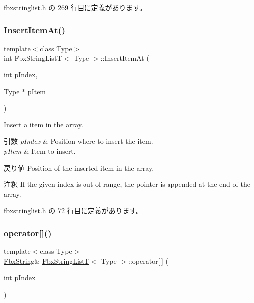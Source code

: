  fbxstringlist.\+h の 269 行目に定義があります。

\mbox{\label{class_fbx_string_list_t_aa9bd662d4638b711c615e37a9038a038}} 
\subsubsection{\texorpdfstring{Insert\+Item\+At()}{InsertItemAt()}}
{\footnotesize\ttfamily template$<$class Type$>$ \\
int \hyperlink{class_fbx_string_list_t}{Fbx\+String\+ListT}$<$ Type $>$\+::Insert\+Item\+At (\begin{DoxyParamCaption}\item[{int}]{p\+Index,  }\item[{Type $\ast$}]{p\+Item }\end{DoxyParamCaption})\hspace{0.3cm}{\ttfamily [inline]}}

Insert a item in the array. 
\begin{DoxyParams}{引数}
{\em p\+Index} & Position where to insert the item. \\
\hline
{\em p\+Item} & Item to insert. \\
\hline
\end{DoxyParams}
\begin{DoxyReturn}{戻り値}
Position of the inserted item in the array. 
\end{DoxyReturn}
\begin{DoxyRemark}{注釈}
If the given index is out of range, the pointer is appended at the end of the array. 
\end{DoxyRemark}


 fbxstringlist.\+h の 72 行目に定義があります。

\mbox{\label{class_fbx_string_list_t_a40ae970b4cbfd3df9117db1c3218b062}} 
\subsubsection{\texorpdfstring{operator[]()}{operator[]()}}
{\footnotesize\ttfamily template$<$class Type$>$ \\
\hyperlink{class_fbx_string}{Fbx\+String}\& \hyperlink{class_fbx_string_list_t}{Fbx\+String\+ListT}$<$ Type $>$\+::operator\mbox{[}$\,$\mbox{]} (\begin{DoxyParamCaption}\item[{int}]{p\+Index }\end{DoxyParamCaption})\hspace{0.3cm}{\ttfamily [inline]}}



